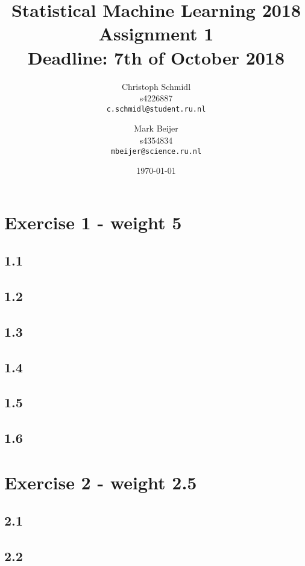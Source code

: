 \documentclass[a4paper]{article}
\title{Statistical Machine Learning 2018\\Assignment 1\\Deadline: 7th of October 2018}
\author{
  Christoph Schmidl\\ s4226887\\      \texttt{c.schmidl@student.ru.nl}
  \and
  Mark Beijer\\ s4354834\\     \texttt{mbeijer@science.ru.nl}
}
\date{\today}
\begin{document}
\maketitle


\section*{Exercise 1 - weight 5}

\subsection*{1.1}




\subsection*{1.2}




\subsection*{1.3}





\subsection*{1.4}





\subsection*{1.5}


\subsection*{1.6}



\section*{Exercise 2 - weight 2.5}

\subsection*{2.1}




\subsection*{2.2}
\end{document}
